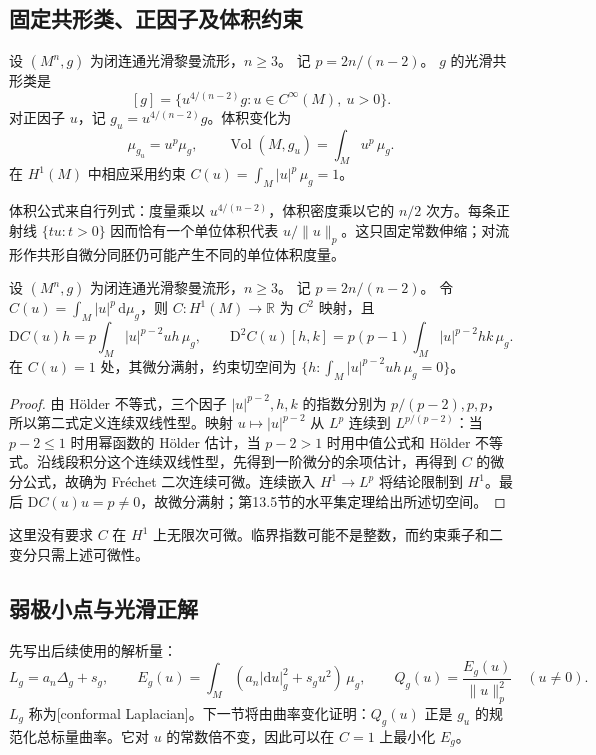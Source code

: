 \subsection{固定共形类、正因子及体积约束}
\label{g3:subsec:2401:02}
\begin{definition}\label{g3:def:yamabe-class-constraint}
	设 \((M^n,g)\) 为闭连通光滑黎曼流形，\(n\ge3\)。
	记 \(p=2n/(n-2)\)。
	\(g\) 的光滑共形类是
	\[
		[g]=\{u^{4/(n-2)}g:u\in C^\infty(M),\ u>0\}.
	\]
	对正因子 \(u\)，记 \(g_u=u^{4/(n-2)}g\)。体积变化为
	\[
		\mu_{g_u}=u^p\mu_g,\qquad
		\operatorname{Vol}(M,g_u)=\int_Mu^p\,\mu_g.
	\]
	在 \(H^1(M)\) 中相应采用约束 \(C(u)=\int_M|u|^p\,\mu_g=1\)。
\end{definition}

体积公式来自行列式：度量乘以 \(u^{4/(n-2)}\)，体积密度乘以它的 \(n/2\) 次方。每条正射线 \(\{tu:t>0\}\) 因而恰有一个单位体积代表 \(u/\|u\|_p\)。这只固定常数伸缩；对流形作共形自微分同胚仍可能产生不同的单位体积度量。

\begin{lemma}\label{g3:lem:yamabe-constraint-smoothness}
	设 \((M^n,g)\) 为闭连通光滑黎曼流形，\(n\ge3\)。
	记 \(p=2n/(n-2)\)。
	令 \(C(u)=\int_M|u|^p\,\mathrm d\mu_g\)，则 \(C:H^1(M)\to\mathbb R\) 为 \(C^2\) 映射，且
	\[
		\mathrm DC(u)h=p\int_M|u|^{p-2}uh\,\mu_g,\qquad
		\mathrm D^2C(u)[h,k]=p(p-1)\int_M|u|^{p-2}hk\,\mu_g.
	\]
	在 \(C(u)=1\) 处，其微分满射，约束切空间为
	\(\{h:\int_M|u|^{p-2}uh\,\mu_g=0\}\)。
\end{lemma}
\begin{proof}
	由 Hölder 不等式，三个因子 \(|u|^{p-2},h,k\) 的指数分别为 \(p/(p-2),p,p\)，所以第二式定义连续双线性型。映射 \(u\mapsto |u|^{p-2}\) 从 \(L^p\) 连续到 \(L^{p/(p-2)}\)：当 \(p-2\le1\) 时用幂函数的 Hölder 估计，当 \(p-2>1\) 时用中值公式和 Hölder 不等式。沿线段积分这个连续双线性型，先得到一阶微分的余项估计，再得到 \(C\) 的微分公式，故确为 Fréchet 二次连续可微。连续嵌入 \(H^1\to L^p\) 将结论限制到 \(H^1\)。最后 \(\mathrm DC(u)u=p\ne0\)，故微分满射；第13.5节的水平集定理给出所述切空间。
\end{proof}

这里没有要求 \(C\) 在 \(H^1\) 上无限次可微。临界指数可能不是整数，而约束乘子和二变分只需上述可微性。

\subsection{弱极小点与光滑正解}
\label{g3:subsec:2401:03}
先写出后续使用的解析量：
\begin{equation}\label{g3:eq:yamabe-energy-definition}
	L_g=a_n\Delta_g+s_g,\qquad
	E_g(u)=\int_M(a_n|\mathrm du|_g^2+s_gu^2)\,\mu_g,\qquad
	Q_g(u)=\frac{E_g(u)}{\|u\|_p^2}\quad(u\ne0).
\end{equation}
\(L_g\) 称为[conformal Laplacian]。下一节将由曲率变化证明：\(Q_g(u)\) 正是 \(g_u\) 的规范化总标量曲率。它对 \(u\) 的常数倍不变，因此可以在 \(C=1\) 上最小化 \(E_g\)。

